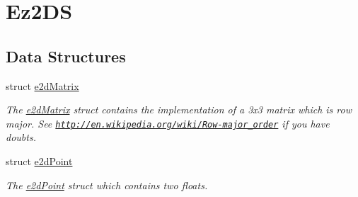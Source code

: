 \hypertarget{group__Ez2DS}{\section{Ez2\-D\-S}
\label{group__Ez2DS}
}
\subsection*{Data Structures}
\begin{DoxyCompactItemize}
\item 
struct \hyperlink{structe2dMatrix}{e2d\-Matrix}
\begin{DoxyCompactList}\small\item\em The \hyperlink{structe2dMatrix}{e2d\-Matrix} struct contains the implementation of a 3x3 matrix which is row major. See \href{http://en.wikipedia.org/wiki/Row-major_order}{\tt http\-://en.\-wikipedia.\-org/wiki/\-Row-\/major\-\_\-order} if you have doubts. \end{DoxyCompactList}\item 
struct \hyperlink{structe2dPoint}{e2d\-Point}
\begin{DoxyCompactList}\small\item\em The \hyperlink{structe2dPoint}{e2d\-Point} struct which contains two floats. \end{DoxyCompactList}\end{DoxyCompactItemize}
